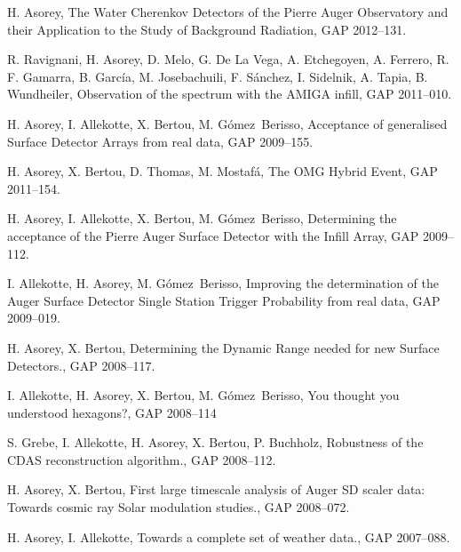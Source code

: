 \begin{etaremune}
\item {} H. Asorey, {{The Water Cherenkov Detectors of the Pierre Auger Observatory and their Application to the Study of Background Radiation}}, GAP 2012--131.

\item {} R. Ravignani, H. Asorey, D. Melo, G. De La Vega, A. Etchegoyen, A. Ferrero, R. F. Gamarra, B. García, M. Josebachuili, F. Sánchez, I. Sidelnik, A. Tapia, B. Wundheiler, {{Observation of the spectrum with the AMIGA infill}}, GAP 2011--010.

\item {}H. Asorey, I. Allekotte, X. Bertou, M. Gómez~Berisso, {{Acceptance of generalised Surface Detector Arrays from real data}}, GAP 2009--155.

\item {}H. Asorey, X. Bertou, D. Thomas, M. Mostafá, {{The OMG Hybrid Event}}, GAP 2011--154.

\item {}H. Asorey, I. Allekotte, X. Bertou, M. Gómez~Berisso, {{Determining the acceptance of the Pierre Auger Surface Detector with the Infill Array}}, GAP 2009--112.

\item {}I. Allekotte, H. Asorey, M. Gómez~Berisso, {{Improving the determination of the Auger Surface Detector Single Station Trigger Probability from real data}}, GAP 2009--019.

\item {}H. Asorey, X. Bertou, {{Determining the Dynamic Range needed for new Surface Detectors.}}, GAP 2008--117.

\item {}I. Allekotte, H. Asorey, X. Bertou, M. Gómez~Berisso, {{You thought you understood hexagons?}}, GAP 2008--114

\item {}S. Grebe, I. Allekotte, H. Asorey, X. Bertou, P. Buchholz, {{Robustness of the CDAS reconstruction algorithm.}}, GAP 2008--112.

\item {}H. Asorey, X. Bertou, {{First large timescale analysis of Auger SD scaler data: Towards cosmic ray Solar modulation studies.}}, GAP 2008--072.

\item {}H. Asorey, I. Allekotte, {{Towards a complete set of weather data.}}, GAP 2007--088.


\end{etaremune}
